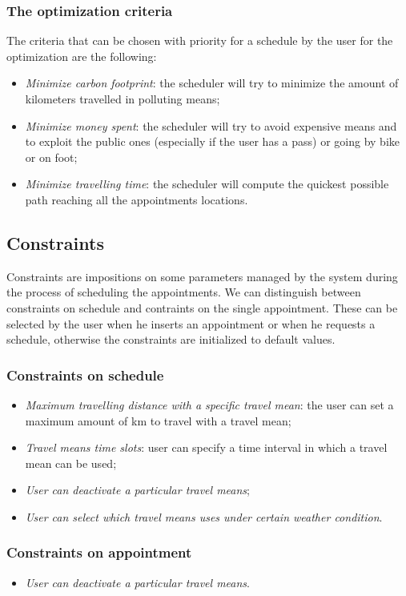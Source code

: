 \subsubsection{The optimization criteria} \label{subsubsect:optcriteria} 
The criteria that can be chosen with priority for a schedule by the user  for the optimization are the following:
\begin{itemize}
\item \textit{Minimize carbon footprint}: the scheduler will try to minimize the amount of kilometers travelled in polluting means;
\item \textit{Minimize money spent}: the scheduler will try to avoid expensive means and to exploit the public ones (especially if the user has a pass) or going by bike or on foot;
\item \textit{Minimize travelling time}: the scheduler will compute the quickest possible path reaching all the appointments locations.
\end{itemize}

\subsection{Constraints}
Constraints are impositions on some parameters managed by the system during the process of scheduling the appointments. We can distinguish between constraints on schedule and contraints on the single appointment. These can be selected by the user when he inserts an appointment or when he requests a schedule, otherwise the constraints are initialized to default values. 

\subsubsection{Constraints on schedule} 
\begin{itemize}
\item \textit{Maximum travelling distance with a specific travel mean}: the user can set a maximum amount of km to travel with a travel mean;
\item\textit{ Travel means time slots}: user can specify a time interval in which a travel mean can be used;
\item \textit{User can deactivate a particular travel means};
\item \textit{User can select which travel means uses under certain weather condition}.
\end{itemize}

\subsubsection{Constraints on appointment}
\begin{itemize}
\item \textit{User can deactivate a particular travel means}.
\end{itemize}

